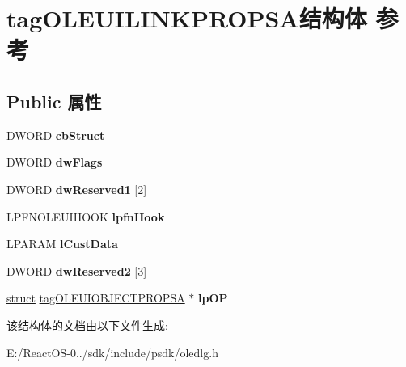 \hypertarget{structtag_o_l_e_u_i_l_i_n_k_p_r_o_p_s_a}{}\section{tag\+O\+L\+E\+U\+I\+L\+I\+N\+K\+P\+R\+O\+P\+S\+A结构体 参考}
\label{structtag_o_l_e_u_i_l_i_n_k_p_r_o_p_s_a}
\subsection*{Public 属性}
\begin{DoxyCompactItemize}
\item 
\mbox{\label{structtag_o_l_e_u_i_l_i_n_k_p_r_o_p_s_a_a57d24e9d28f6eb640e6623635f18fef7}} 
D\+W\+O\+RD {\bfseries cb\+Struct}
\item 
\mbox{\label{structtag_o_l_e_u_i_l_i_n_k_p_r_o_p_s_a_a27c11af55a848e578cfa67bb1fc7cd84}} 
D\+W\+O\+RD {\bfseries dw\+Flags}
\item 
\mbox{\label{structtag_o_l_e_u_i_l_i_n_k_p_r_o_p_s_a_a96d6d30ebedf636f2c3abef681223f8c}} 
D\+W\+O\+RD {\bfseries dw\+Reserved1} \mbox{[}2\mbox{]}
\item 
\mbox{\label{structtag_o_l_e_u_i_l_i_n_k_p_r_o_p_s_a_a081b2c0fa96a5d0b7d074712e2524cae}} 
L\+P\+F\+N\+O\+L\+E\+U\+I\+H\+O\+OK {\bfseries lpfn\+Hook}
\item 
\mbox{\label{structtag_o_l_e_u_i_l_i_n_k_p_r_o_p_s_a_abcd487b744bb561c98fea4b65aa1abbf}} 
L\+P\+A\+R\+AM {\bfseries l\+Cust\+Data}
\item 
\mbox{\label{structtag_o_l_e_u_i_l_i_n_k_p_r_o_p_s_a_ab7cb741c29ef499ea5e648bbb40bce32}} 
D\+W\+O\+RD {\bfseries dw\+Reserved2} \mbox{[}3\mbox{]}
\item 
\mbox{\label{structtag_o_l_e_u_i_l_i_n_k_p_r_o_p_s_a_a130b308d1b69f5b321b2e014a0494240}} 
\hyperlink{interfacestruct}{struct} \hyperlink{structtag_o_l_e_u_i_o_b_j_e_c_t_p_r_o_p_s_a}{tag\+O\+L\+E\+U\+I\+O\+B\+J\+E\+C\+T\+P\+R\+O\+P\+SA} $\ast$ {\bfseries lp\+OP}
\end{DoxyCompactItemize}


该结构体的文档由以下文件生成\+:\begin{DoxyCompactItemize}
\item 
E\+:/\+React\+O\+S-\/0../sdk/include/psdk/oledlg.\+h\end{DoxyCompactItemize}
